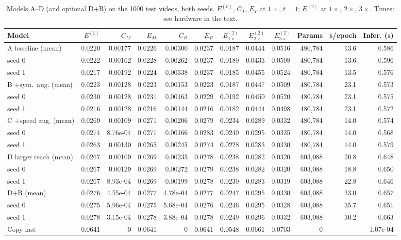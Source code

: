 \begin{table}[H]\centering\scriptsize\setlength{\tabcolsep}{2.5pt}
\caption{Models A--D (and optional D+B) on the 1000 test videos, both seeds. $E^{(5)}$, $C_T$, $E_T$ at $1\times$, $t=1$; $E^{(2)}$ at $1\times$, $2\times$, $3\times$. Times: see hardware in the text.}\label{tab:t5}
\begin{tabular}{lrrrrrrrrrrr}\toprule
Model & $E^{(5)}$ & $C_M$ & $E_M$ & $C_R$ & $E_R$ & $E^{(2)}_{1\times}$ & $E^{(2)}_{2\times}$ & $E^{(2)}_{3\times}$ & Params & s/epoch & Infer. (s) \\ \midrule
A baseline (mean) & 0.0220 & 0.00177 & 0.0226 & 0.00300 & 0.0237 & 0.0187 & 0.0444 & 0.0516 & 480{,}784 & 13.6 & 0.586 \\
\quad seed 0 & 0.0222 & 0.00162 & 0.0228 & 0.00262 & 0.0237 & 0.0189 & 0.0433 & 0.0508 & 480{,}784 & 13.6 & 0.596 \\
\quad seed 1 & 0.0217 & 0.00192 & 0.0224 & 0.00338 & 0.0237 & 0.0185 & 0.0455 & 0.0524 & 480{,}784 & 13.5 & 0.576 \\
\midrule
B +sym.\ aug. (mean) & 0.0223 & 0.00128 & 0.0223 & 0.00153 & 0.0223 & 0.0187 & 0.0447 & 0.0509 & 480{,}784 & 23.1 & 0.573 \\
\quad seed 0 & 0.0230 & 0.00128 & 0.0231 & 0.00163 & 0.0229 & 0.0192 & 0.0450 & 0.0520 & 480{,}784 & 23.1 & 0.575 \\
\quad seed 1 & 0.0216 & 0.00128 & 0.0216 & 0.00144 & 0.0216 & 0.0182 & 0.0444 & 0.0498 & 480{,}784 & 23.1 & 0.572 \\
\midrule
C +speed aug. (mean) & 0.0269 & 0.00109 & 0.0271 & 0.00206 & 0.0279 & 0.0234 & 0.0289 & 0.0332 & 480{,}784 & 14.0 & 0.574 \\
\quad seed 0 & 0.0274 & 8.76e-04 & 0.0277 & 0.00166 & 0.0283 & 0.0240 & 0.0295 & 0.0335 & 480{,}784 & 14.0 & 0.568 \\
\quad seed 1 & 0.0263 & 0.00130 & 0.0265 & 0.00245 & 0.0274 & 0.0228 & 0.0283 & 0.0330 & 480{,}784 & 14.0 & 0.579 \\
\midrule
D larger reach (mean) & 0.0267 & 0.00109 & 0.0269 & 0.00235 & 0.0278 & 0.0238 & 0.0282 & 0.0320 & 603{,}088 & 20.8 & 0.648 \\
\quad seed 0 & 0.0267 & 0.00129 & 0.0269 & 0.00272 & 0.0279 & 0.0238 & 0.0282 & 0.0320 & 603{,}088 & 18.8 & 0.650 \\
\quad seed 1 & 0.0267 & 8.93e-04 & 0.0269 & 0.00199 & 0.0278 & 0.0239 & 0.0283 & 0.0319 & 603{,}088 & 22.8 & 0.646 \\
\midrule
D+B (mean) & 0.0276 & 4.55e-04 & 0.0277 & 4.78e-04 & 0.0277 & 0.0247 & 0.0295 & 0.0330 & 603{,}088 & 33.0 & 0.657 \\
\quad seed 0 & 0.0275 & 5.96e-04 & 0.0275 & 5.68e-04 & 0.0276 & 0.0246 & 0.0295 & 0.0328 & 603{,}088 & 35.7 & 0.651 \\
\quad seed 1 & 0.0278 & 3.15e-04 & 0.0278 & 3.88e-04 & 0.0278 & 0.0249 & 0.0296 & 0.0332 & 603{,}088 & 30.2 & 0.663 \\
\midrule
Copy-last & 0.0641 & 0 & 0.0641 & 0 & 0.0641 & 0.0548 & 0.0661 & 0.0703 & 0 & -- & 1.07e-04 \\
\bottomrule\end{tabular}
\end{table}
